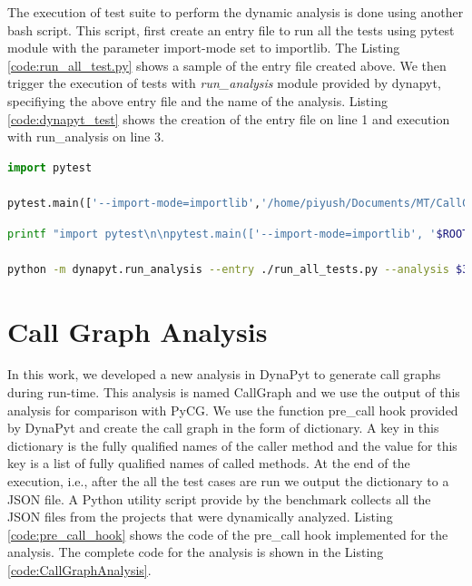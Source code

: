The execution of test suite to perform the dynamic analysis is done using another bash script.
This script, first create an entry file to run all the tests using pytest module with the parameter import-mode set to importlib.
The Listing \ref{code:run_all_test.py} shows a sample of the entry file created above.
We then trigger the execution of tests with \textit{run\_analysis} module provided by dynapyt, specifiying the above entry file and the name of the analysis.
Listing \ref{code:dynapyt_test} shows the creation of the entry file on line 1 and execution with run\_analysis on line 3.
\begin{lstlisting}[caption=DynaPyt Execution Entry File,label=code:run_all_test.py,language=Python]
import pytest

pytest.main(['--import-mode=importlib','/home/piyush/Documents/MT/CallGraph/flask-api/flask_api/tests/'])
\end{lstlisting}
\begin{lstlisting}[caption=DynaPyt Test Suite Execution,label=code:dynapyt_test,language=Bash]
printf "import pytest\n\npytest.main(['--import-mode=importlib', '$ROOT_DIR/temp/project$2/$4'])\n" > run_all_tests.py

python -m dynapyt.run_analysis --entry ./run_all_tests.py --analysis $3
\end{lstlisting}

\section{Call Graph Analysis}
\label{impl:Call Graph Analysis}
In this work, we developed a new analysis in DynaPyt to generate call graphs during run-time.
This analysis is named CallGraph and we use the output of this analysis for comparison with PyCG.
We use the function pre\_call hook provided by DynaPyt and create the call graph in the form of dictionary.
A key in this dictionary is the fully qualified names of the caller method and the value for this key is a list of fully qualified names of called methods.
At the end of the execution, i.e., after the all the test cases are run we output the dictionary to a JSON file.
A Python utility script provide by the benchmark collects all the JSON files from the projects that were dynamically analyzed.
Listing \ref{code:pre_call_hook} shows the code of the pre\_call hook implemented for the analysis.
The complete code for the analysis is shown in the Listing \ref{code:CallGraphAnalysis}.

